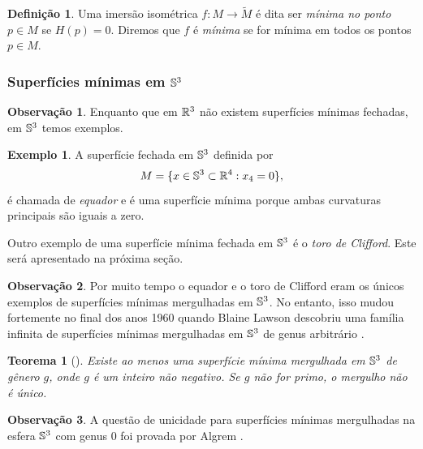 \documentclass[12pt,a4paper]{beamer}
\newtheorem{teorema}{Teorema}
\theoremstyle{definition}
\newtheorem{definicao}{Definição}
\newtheorem{observacao}{Observação}
\newtheorem{exemplo}{Exemplo}
\begin{document}
\begin{frame}[allowframebreaks]
	\begin{definicao}
		Uma imersão isométrica $f: M \rightarrow \tilde{M}$ é dita ser \emph{mínima no ponto} $p \in M$ se $H(p)=0$. Diremos que $f$ é \emph{mínima} se for mínima em todos os pontos $p \in M$.
	\end{definicao}
\end{frame}


\begin{frame}[allowframebreaks]
	\frametitle{Superfícies mínimas em $\mathbb{S}^3$}

	\begin{observacao}
		Enquanto que em $\mathbb R^3$ não existem superfícies mínimas fechadas, em $\mathbb{S}^3$ temos exemplos.
	\end{observacao}

	\begin{exemplo}
		A superfície fechada em $\mathbb{S}^3$ definida por
		\begin{equation*}
		M = \{ x \in \mathbb{S}^3 \subset \mathbb R^4: x_4 = 0 \},
		\end{equation*}
		é chamada de \emph{equador} e é uma superfície mínima porque ambas curvaturas principais são iguais a zero.
	\end{exemplo}

	Outro exemplo de uma superfície mínima fechada em $\mathbb{S}^3$ é o \emph{toro de Clifford}. Este será apresentado na próxima seção.
	
%	

	\begin{observacao}
		Por muito tempo o equador e o toro de Clifford eram os únicos exemplos de superfícies mínimas mergulhadas em $\mathbb{S}^3$. No entanto, isso mudou fortemente no final dos
		anos 1960 quando Blaine Lawson descobriu uma família infinita de superfícies mínimas
		mergulhadas em $\mathbb{S}^3$ de genus arbitrário \cite{Lawson1970}.
	\end{observacao}

	\begin{teorema}[\cite{Lawson1970}]
		Existe ao menos uma superfície mínima mergulhada em $\mathbb{S}^3$	de gênero $g$, onde $g$ é um inteiro não negativo. Se $g$ não for primo, o mergulho não é único.
	\end{teorema}
	
	\begin{observacao}
		A questão de unicidade para superfícies mínimas mergulhadas na esfera $\mathbb{S}^3$ com genus $0$ foi provada por Algrem \cite{Almgren1966}.
	\end{observacao}
\end{frame}
\end{document}
